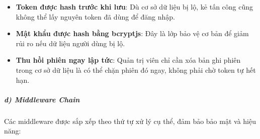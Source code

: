 \documentclass[a4paper]{extarticle}
\providecommand{\tightlist}{%
  \setlength{\itemsep}{0pt}\setlength{\parskip}{0pt}}
\begin{document}
\begin{itemize}
\tightlist
\item
  \textbf{Token được hash trước khi lưu}: Dù cơ sở dữ liệu bị lộ, kẻ tấn
  công cũng không thể lấy nguyên token đã dùng để đăng nhập.
\item
  \textbf{Mật khẩu được hash bằng bcryptjs}: Đây là lớp bảo vệ cơ bản để
  giảm rủi ro nếu dữ liệu người dùng bị lộ.
\item
  \textbf{Thu hồi phiên ngay lập tức}: Quản trị viên chỉ cần xóa bản ghi
  phiên trong cơ sở dữ liệu là có thể chặn phiên đó ngay, không phải chờ
  token tự hết hạn.
\end{itemize}

\subparagraph{d) Middleware Chain}\label{d-middleware-chain}

Các middleware được sắp xếp theo thứ tự xử lý cụ thể, đảm bảo bảo mật và
hiệu năng:
\end{document}
